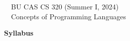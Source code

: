 \documentclass[11pt]{article}
\begin{document}
\begin{flushright}
\begin{minipage}{430pt}
{
\begin{flushleft}
{~~\large\sc BU CAS CS 320 (Summer I, 2024)} \\
{~~\LARGE\sc Concepts of Programming Languages}
\end{flushleft}
}
\end{minipage}
\end{flushright}

\vspace{12pt}
\begin{center}
\begin{minipage}{16cm}
\begin{center}
{\LARGE\bf Syllabus} \\[12pt]
\end{center}
\end{minipage}
\end{center}

\thispagestyle{empty}
\end{document}
